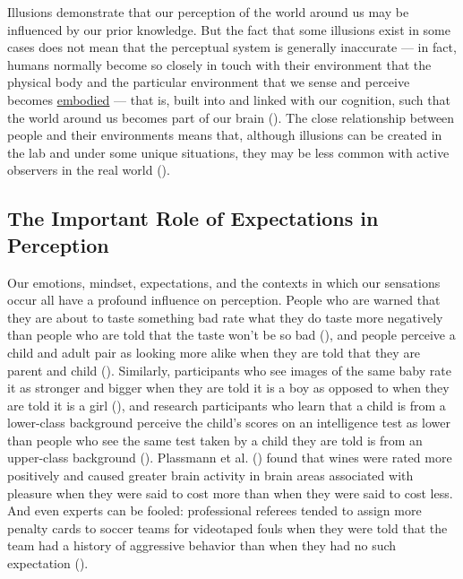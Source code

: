 \documentclass[
]{krantz}
\begin{document}
Illusions demonstrate that our perception of the world around us may be influenced by our prior knowledge. But the fact that some illusions exist in some cases does not mean that the perceptual system is generally inaccurate --- in fact, humans normally become so closely in touch with their environment that the physical body and the particular environment that we sense and perceive becomes \hyperref[embodied]{embodied} --- that is, built into and linked with our cognition, such that the world around us becomes part of our brain (). The close relationship between people and their environments means that, although illusions can be created in the lab and under some unique situations, they may be less common with active observers in the real world ().

\subsection*{The Important Role of Expectations in Perception}\label{the-important-role-of-expectations-in-perception}


Our emotions, mindset, expectations, and the contexts in which our sensations occur all have a profound influence on perception. People who are warned that they are about to taste something bad rate what they do taste more negatively than people who are told that the taste won't be so bad (), and people perceive a child and adult pair as looking more alike when they are told that they are parent and child (). Similarly, participants who see images of the same baby rate it as stronger and bigger when they are told it is a boy as opposed to when they are told it is a girl (), and research participants who learn that a child is from a lower-class background perceive the child's scores on an intelligence test as lower than people who see the same test taken by a child they are told is from an upper-class background (). Plassmann et al. () found that wines were rated more positively and caused greater brain activity in brain areas associated with pleasure when they were said to cost more than when they were said to cost less. And even experts can be fooled: professional referees tended to assign more penalty cards to soccer teams for videotaped fouls when they were told that the team had a history of aggressive behavior than when they had no such expectation ().
\end{document}
